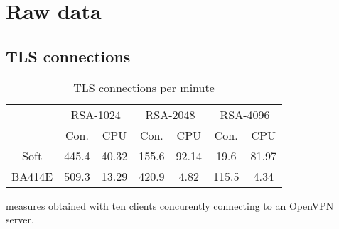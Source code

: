 \chapter{Raw data}

\section{TLS connections}

\begin{table}[ht]
\center
\begin{tabular}{l|c|c|c|c|c|c|} \cline{2-7}
 & \multicolumn{2}{c|}{RSA-1024} & \multicolumn{2}{c|}{RSA-2048} & \multicolumn{2}{c|}{RSA-4096} \\ \cline{2-7}
 & Con. & CPU & Con. & CPU & Con. & CPU \\ \hline
\multicolumn{1}{|c|}{Soft} & 445.4 & 40.32 & 155.6 & 92.14 & 19.6 & 81.97 \\ \hline
\multicolumn{1}{|c|}{BA414E} & 509.3 & 13.29 & 420.9 & 4.82 & 115.5 & 4.34 \\ \hline
\end{tabular}
\caption{TLS connections per minute}{measures obtained with ten clients concurently connecting to an OpenVPN server.}
\label{tab:tls-con}
\end{table}